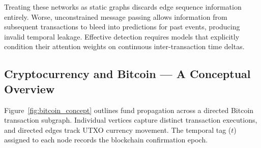 Treating these networks as static graphs discards edge sequence information entirely. Worse, unconstrained message passing allows information from subsequent transactions to bleed into predictions for past events, producing invalid temporal leakage. Effective detection requires models that explicitly condition their attention weights on continuous inter-transaction time deltas.

\subsection{Cryptocurrency and Bitcoin — A Conceptual Overview}

Figure~\ref{fig:bitcoin_concept} outlines fund propagation across a directed Bitcoin transaction subgraph. Individual vertices capture distinct transaction executions, and directed edges track UTXO currency movement. The temporal tag ($t$) assigned to each node records the blockchain confirmation epoch.

